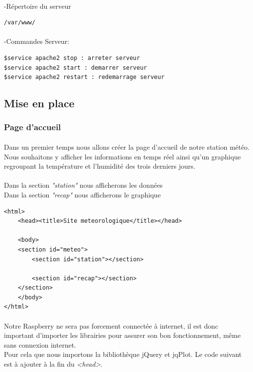 \documentclass[a4paper, titlepage, oneside, 12pt]{article}%
\begin{document}
\paragraph{}
-Répertoire du serveur
\begin{lstlisting}
/var/www/
\end{lstlisting}
\paragraph{}
-Commandes Serveur:
\begin{lstlisting}
$service apache2 stop : arreter serveur
$service apache2 start : demarrer serveur
$service apache2 restart : redemarrage serveur
\end{lstlisting}

\subsection{Mise en place}
\subsubsection{Page d'accueil}
\paragraph{}
Dans un premier temps nous allons créer la page d’accueil de notre station météo.
Nous souhaitons y afficher les informations en temps réel ainsi qu'un graphique regroupant la température et l'humidité des trois derniers jours.\\ \\ 
Dans la section \textit{"station"} nous afficherons les données\\
Dans la section \textit{"recap"} nous afficherons le graphique\\


\begin{lstlisting}
<html>
	<head><title>Site meteorologique</title></head>

	<body>
	<section id="meteo">		
		<section id="station"></section>
				
		<section id="recap"></section>
	</section>
	</body>
</html>
\end{lstlisting}

\paragraph{}
Notre Raspberry ne sera pas forcement connectée à internet, il est donc important d'importer les librairies pour assurer son bon fonctionnement, même sans connexion internet.\\
Pour cela que nous importons la bibliothèque jQuery et jqPlot. Le code suivant est à ajouter à la fin du \textit{<head>}.
\end{document}
